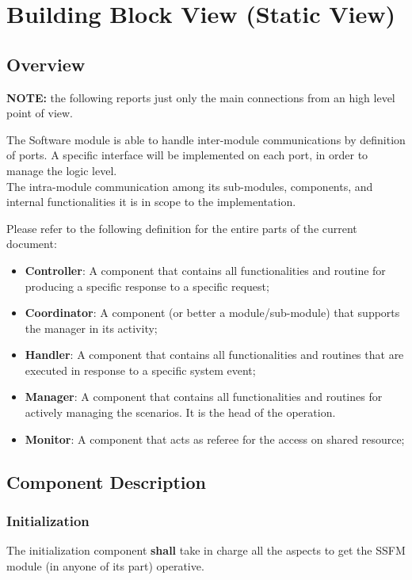 \chapter{Building Block View (Static View)}
\label{chp:staticView}

\section{Overview}
\label{sec:overview}

\textbf{NOTE:} the following reports just only the main connections from an high level point of view.

The Software module is able to handle inter-module communications by definition of ports. A specific interface will be implemented on each port,
in order to manage the logic level.\\
The intra-module communication among its sub-modules, components, and internal functionalities it is in scope to the implementation.

Please refer to the following definition for the entire parts of the current document:

\begin{itemize}
    \item \textbf{Controller}: A component that contains all functionalities and routine for producing a specific response to a specific request;
    \item \textbf{Coordinator}: A component (or better a module/sub-module) that supports the manager in its activity;
    \item \textbf{Handler}: A component that contains all functionalities and routines that are executed in response to a specific system event;
    \item \textbf{Manager}: A component that contains all functionalities and routines for actively managing the scenarios. It is the head of the operation.
    \item \textbf{Monitor}: A component that acts as referee for the access on shared resource; 
\end{itemize}

\section{Component Description}

\subsection{Initialization}
\label{subsec:Init}
The initialization component \textbf{shall} take in charge all the aspects to get the SSFM module (in anyone of its part) operative.

